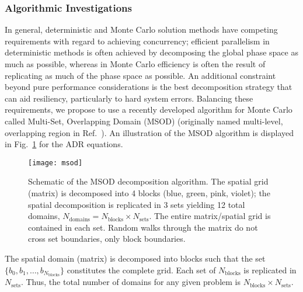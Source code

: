 \subsubsection{Algorithmic Investigations}

In general, deterministic and Monte Carlo solution methods have competing
requirements with regard to achieving concurrency; efficient parallelism in
deterministic methods is often achieved by decomposing the global phase space
as much as possible, whereas in Monte Carlo efficiency is often the result of
replicating as much of the phase space as possible.  An additional constraint
beyond pure performance considerations is the best decomposition strategy that
can aid resiliency, particularly to hard system errors.  Balancing these
requirements, we propose to use a recently developed algorithm for Monte Carlo
called Multi-Set, Overlapping Domain (MSOD) \cite{Wagner:2011wc} (originally
named multi-level, overlapping region in Ref.~\cite{Wagner:2011wc}).  An
illustration of the MSOD algorithm is displayed in Fig.~\ref{fig:msod} for the
ADR equations.
\begin{figure}[h]
  \begin{center}
    \texttt{[image: msod]}
  \end{center}
  \caption{Schematic of the MSOD decomposition algorithm. The spatial grid
    (matrix) is decomposed into 4 blocks (blue, green, pink, violet); the
    spatial decomposition is replicated in 3 sets yielding 12 total domains, $
    N_\mathrm{domains} = N_\mathrm{blocks}\times N_\mathrm{sets}$.  The entire
    matrix/spatial grid is contained in each set.  Random walks through the
    matrix do not cross set boundaries, only block boundaries.  }
    \label{fig:msod}
\end{figure}
The spatial domain (matrix) is decomposed into blocks such that the set
$\{b_0,b_1,\ldots,b_{N_\mathrm{blocks}}\}$ constitutes the complete grid.
Each set of $N_\mathrm{blocks}$ is replicated in $N_\mathrm{sets}$.  Thus, the
total number of domains for any given problem is $N_\mathrm{blocks}\times
N_\mathrm{sets}$.  

